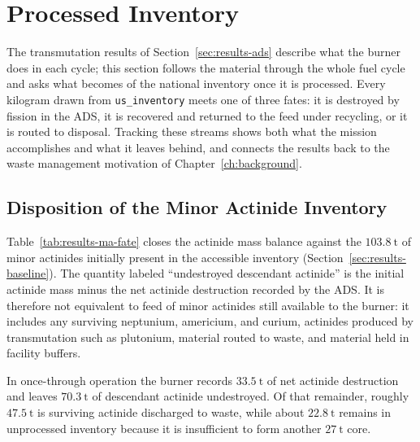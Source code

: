 
\section{Processed Inventory}
\label{sec:results-evolution}

The transmutation results of Section~\ref{sec:results-ads} describe what the
burner does in each cycle; this section follows the material through the whole fuel
cycle and asks what becomes of the national inventory once it is processed. Every
kilogram drawn from \texttt{us\_inventory} meets one of three fates: it is
destroyed by fission in the \gls{ADS}, it is recovered and returned to the feed
under recycling, or it is routed to disposal. Tracking these streams shows both
what the mission accomplishes and what it leaves behind, and connects the results
back to the waste management motivation of Chapter~\ref{ch:background}.

\subsection{Disposition of the Minor Actinide Inventory}
\label{subsec:results-fate-ma}

Table~\ref{tab:results-ma-fate} closes the actinide mass balance against the
\(103.8~\mathrm{t}\) of minor actinides initially present in the accessible
inventory (Section~\ref{sec:results-baseline}). The quantity labeled
``undestroyed descendant actinide'' is the initial actinide mass minus the net
actinide destruction recorded by the ADS. It is therefore not equivalent to
feed of minor actinides still available to the burner: it includes any surviving
neptunium, americium, and curium, actinides produced by transmutation such as
plutonium, material routed to waste, and material held in facility buffers.

In once-through operation the burner records \(33.5~\mathrm{t}\) of net actinide
destruction and leaves \(70.3~\mathrm{t}\) of descendant actinide undestroyed. Of
that remainder, roughly \(47.5~\mathrm{t}\) is surviving actinide discharged to
waste, while about \(22.8~\mathrm{t}\) remains in unprocessed inventory because
it is insufficient to form another \(27~\mathrm{t}\) core.

